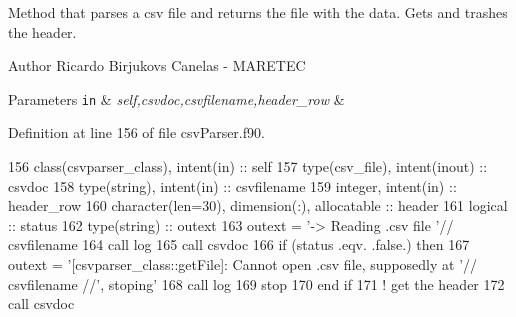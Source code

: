 Method that parses a csv file and returns the file with the data. Gets and trashes the header. 

\begin{DoxyAuthor}{Author}
Ricardo Birjukovs Canelas -\/ M\+A\+R\+E\+T\+EC 
\end{DoxyAuthor}

\begin{DoxyParams}[1]{Parameters}
\mbox{\tt in}  & {\em self,csvdoc,csvfilename,header\+\_\+row} & \\
\hline
\end{DoxyParams}


Definition at line 156 of file csv\+Parser.\+f90.


\begin{DoxyCode}
156     \textcolor{keywordtype}{class}(csvparser\_class), \textcolor{keywordtype}{intent(in)} :: self
157     \textcolor{keywordtype}{type}(csv\_file), \textcolor{keywordtype}{intent(inout)} :: csvdoc
158     \textcolor{keywordtype}{type}(string), \textcolor{keywordtype}{intent(in)} :: csvfilename
159     \textcolor{keywordtype}{integer}, \textcolor{keywordtype}{intent(in)} :: header\_row
160     \textcolor{keywordtype}{character(len=30)}, \textcolor{keywordtype}{dimension(:)}, \textcolor{keywordtype}{allocatable} :: header
161     \textcolor{keywordtype}{logical} :: status
162     \textcolor{keywordtype}{type}(string) :: outext
163     outext = \textcolor{stringliteral}{'-> Reading .csv file '}// csvfilename
164     \textcolor{keyword}{call }log%
165     \textcolor{keyword}{call }csvdoc%
166     \textcolor{keywordflow}{if} (status .eqv. .false.) \textcolor{keywordflow}{then}
167         outext = \textcolor{stringliteral}{'[csvparser\_class::getFile]: Cannot open .csv file, supposedly at '}// csvfilename //\textcolor{stringliteral}{',
       stoping'}
168         \textcolor{keyword}{call }log%
169         stop
170 \textcolor{keywordflow}{    end if}
171     \textcolor{comment}{! get the header}
172     \textcolor{keyword}{call }csvdoc%
\end{DoxyCode}
